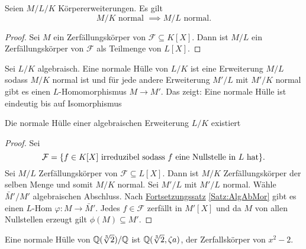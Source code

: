 \begin{Lemma}
    Seien \(M/L/K\) Körpererweiterungen. Es gilt \[M/K \text{ normal }\implies M/L \text{ normal.}\]
\end{Lemma}
\begin{proof}
    Sei \(M\) ein Zerfällungskörper von \(\mathcal{F}\subseteq K[X]\). Dann ist \(M/L\) ein Zerfällungskörper von \(\mathcal F\) als Teilmenge von \(L[X].\)
\end{proof}
\begin{Def}
    Sei \(L/K\) algebraisch. Eine normale Hülle von \(L/K\) ist eine Erweiterung \(M/L\) sodass \(M/K\) normal ist und für jede andere Erweiterung \(M'/L\) mit \(M'/K\) normal gibt es einen \(L\)-Homomorphismus \(M\to M'\). Das zeigt: Eine normale Hülle ist eindeutig bis auf Isomorphismus
\end{Def}
\begin{Satz}
    Die normale Hülle einer algebraischen Erweiterung \(L/K\) existiert
\end{Satz}
\begin{proof}
    Sei \[\mathcal F=\{f\in K[X] \text{ irreduzibel sodass \(f\) eine Nullstelle in \(L\) hat}\}.\] Sei \(M/L\) Zerfällungskörper von \(\mathcal F\subseteq L[X]\). Dann ist \(M/K\) Zerfällungskörper der selben Menge und somit \(M/K\) normal. Sei \(M'/L\) mit \(M'/L\) normal. Wähle \(\bar M'/M'\) algebraischen Abschluss. Nach \hyperref[Satz:AlgAbMor]{Fortsetzungssatz} \ref{Satz:AlgAbMor} gibt es einen \(L\)-Hom \(\varphi\colon M\to\bar M'\). Jedes \(f\in\mathcal F\) zerfällt in \(M'[X]\) und da \(M\) von allen Nullstellen erzeugt gilt \(\phi(M)\subseteq M'\).
\end{proof}
\begin{Bsp}
    Eine normale Hülle von \(\mathbb{Q}(\sqrt[3]{2})/\mathbb{Q}\) ist \(\mathbb{Q}(\sqrt[3]{2},\zeta a)\), der Zerfallskörper von \(x^2-2.\)
\end{Bsp}
